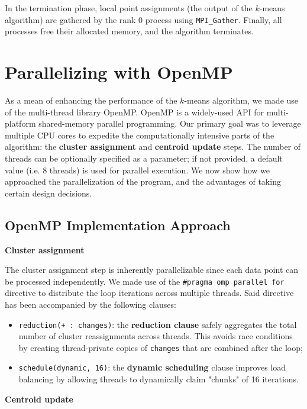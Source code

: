 \documentclass[11pt, journal]{IEEEtran}
\newcommand{\nwl}{

\vspace{11pt}

}
\begin{document}
In the termination phase, local point assignments (the output of the $k$-means algorithm) are gathered by the rank 0 process using \texttt{MPI\_Gather}. Finally, all processes free their allocated memory, and the algorithm terminates.

\section{Parallelizing with OpenMP}

As a mean of enhancing the performance of the $k$-means algorithm, we made use of the multi-thread library OpenMP. OpenMP is a widely-used API for multi-platform shared-memory parallel programming. Our primary goal was to leverage multiple CPU cores to expedite the computationally intensive parts of the algorithm: the \textbf{cluster assignment} and \textbf{centroid update} steps. The number of threads can be optionally specified as a parameter; if not provided, a default value (i.e. 8 threads) is used for parallel execution.
We now show how we approached the parallelization of the program, and the advantages of taking certain design decisions.
 
\subsection{OpenMP Implementation Approach}

\noindent \textbf{Cluster assignment}

The cluster assignment step is inherently parallelizable since each data point can be processed independently. We made use of the \texttt{\#pragma omp parallel for} directive to distribute the loop iterations across multiple threads. Said directive has been accompanied by the following clauses:

\begin{itemize}
    \item \texttt{reduction(+ : changes)}: the \textbf{reduction clause} safely aggregates the total number of cluster reassignments across threads. This avoids race conditions by creating thread-private copies of \texttt{changes} that are combined after the loop;
    \item \texttt{schedule(dynamic, 16)}: the \textbf{dynamic scheduling} clause improves load balancing by allowing threads to dynamically claim "chunks" of 16 iterations.
\end{itemize}
\nwl
\noindent \textbf{Centroid update}
\end{document}
